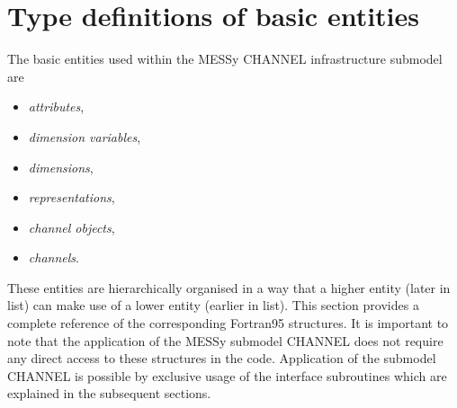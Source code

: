 \documentclass[twoside]{article}
\begin{document}
\section{Type definitions of basic entities}
\label{sec:types}
The basic entities used within the MESSy CHANNEL infrastructure submodel are
\begin{itemize}
 \item {\it attributes},
 \item {\it dimension variables},
 \item {\it dimensions},
 \item {\it representations},
 \item {\it channel objects},
 \item {\it channels}.
\end{itemize}
%
These entities are hierarchically organised in a way that a higher entity
(later in list) can make use of a lower entity (earlier in list).
%
This section provides a complete reference of the corresponding Fortran95
structures. It is important to note that the application of the MESSy submodel
CHANNEL does not require any direct access to these structures in the code.
Application of the submodel CHANNEL is possible by exclusive usage of the
interface subroutines which are explained in the subsequent sections.
\end{document}
